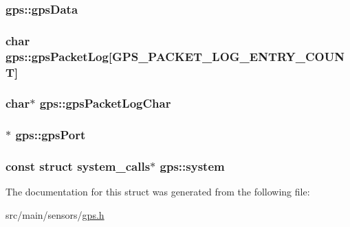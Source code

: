 \hypertarget{structgps_a20af1aa168a31776b9e035d9fd0c35e7}{
\subsubsection[{gps\+Data}]{ gps\+::gps\+Data}}\label{structgps_a20af1aa168a31776b9e035d9fd0c35e7}
\hypertarget{structgps_a1eb759a3e0ba730d081137ac256b76a7}{
\subsubsection[{gps\+Packet\+Log}]{\setlength{\rightskip}{0pt plus 5cm}char gps\+::gps\+Packet\+Log\mbox{[}{\bf G\+P\+S\+\_\+\+P\+A\+C\+K\+E\+T\+\_\+\+L\+O\+G\+\_\+\+E\+N\+T\+R\+Y\+\_\+\+C\+O\+U\+N\+T}\mbox{]}}}\label{structgps_a1eb759a3e0ba730d081137ac256b76a7}
\hypertarget{structgps_a1055c6f779022becba696e243dfcdca1}{
\subsubsection[{gps\+Packet\+Log\+Char}]{\setlength{\rightskip}{0pt plus 5cm}char$\ast$ gps\+::gps\+Packet\+Log\+Char}}\label{structgps_a1055c6f779022becba696e243dfcdca1}
\hypertarget{structgps_a7fd3c434677f4d8b8b64f4596a276d64}{
\subsubsection[{gps\+Port}]{$\ast$ gps\+::gps\+Port}}\label{structgps_a7fd3c434677f4d8b8b64f4596a276d64}
\hypertarget{structgps_a0eaf8e4b1c5d62ec0e2b9bfad8016764}{
\subsubsection[{system}]{\setlength{\rightskip}{0pt plus 5cm}const struct {\bf system\+\_\+calls}$\ast$ gps\+::system}}\label{structgps_a0eaf8e4b1c5d62ec0e2b9bfad8016764}


The documentation for this struct was generated from the following file\+:\begin{DoxyCompactItemize}
\item 
src/main/sensors/\hyperlink{sensors_2gps_8h}{gps.\+h}\end{DoxyCompactItemize}
